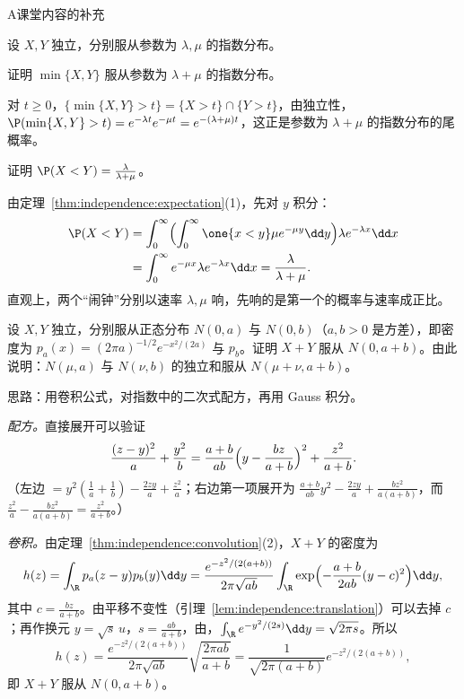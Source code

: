 \begin{exercises}{A}{课堂内容的补充}
\item\label{ex:independence:A5} 设 $X,Y$ 独立，分别服从参数为 $\lambda,\mu$ 的指数分布。
\begin{questions}
\item 证明 $\min\{X,Y\}$ 服从参数为 $\lambda+\mu$ 的指数分布。
\begin{solution}
对 $t\geqslant0$，$\{\min\{X,Y\}>t\}=\{X>t\}\cap\{Y>t\}$，由独立性，$\P(\min\{X,Y\}>t)=e^{-\lambda t}e^{-\mu t}=e^{-(\lambda+\mu)t}$，这正是参数为 $\lambda+\mu$ 的指数分布的尾概率。
\end{solution}
\item 证明 $\P(X<Y)=\frac\lambda{\lambda+\mu}$。
\begin{solution}
由定理~\ref{thm:independence:expectation}(1)，先对 $y$ 积分：
\[
\begin{aligned}
\P(X<Y)&=\int_0^\infty\Bigl(\int_0^\infty\one\{x<y\}\mu e^{-\mu y}\dd y\Bigr)\lambda e^{-\lambda x}\dd x\\
&=\int_0^\infty e^{-\mu x}\lambda e^{-\lambda x}\dd x=\frac\lambda{\lambda+\mu}.
\end{aligned}
\]
直观上，两个“闹钟”分别以速率 $\lambda,\mu$ 响，先响的是第一个的概率与速率成正比。
\end{solution}
\end{questions}

\item\label{ex:independence:A6} 设 $X,Y$ 独立，分别服从正态分布 $N(0,a)$ 与 $N(0,b)$（$a,b>0$ 是方差），即密度为 $p_a(x)=(2\pi a)^{-1/2}e^{-x^2/(2a)}$ 与 $p_b$。证明 $X+Y$ 服从 $N(0,a+b)$。由此说明：$N(\mu,a)$ 与 $N(\nu,b)$ 的独立和服从 $N(\mu+\nu,a+b)$。
\begin{solution}
思路：用卷积公式，对指数中的二次式配方，再用 Gauss 积分。

\emph{配方。}直接展开可以验证
\[
\frac{(z-y)^2}a+\frac{y^2}b=\frac{a+b}{ab}\Bigl(y-\frac{bz}{a+b}\Bigr)^2+\frac{z^2}{a+b}.
\]
（左边 $=y^2(\frac1a+\frac1b)-\frac{2zy}a+\frac{z^2}a$；右边第一项展开为 $\frac{a+b}{ab}y^2-\frac{2zy}a+\frac{bz^2}{a(a+b)}$，而 $\frac{z^2}a-\frac{bz^2}{a(a+b)}=\frac{z^2}{a+b}$。）

\emph{卷积。}由定理~\ref{thm:independence:convolution}(2)，$X+Y$ 的密度为
\[
h(z)=\int_\R p_a(z-y)p_b(y)\dd y=\frac{e^{-z^2/(2(a+b))}}{2\pi\sqrt{ab}}\int_\R\exp\Bigl(-\frac{a+b}{2ab}(y-c)^2\Bigr)\dd y,
\]
其中 $c=\frac{bz}{a+b}$。由平移不变性（引理~\ref{lem:independence:translation}）可以去掉 $c$；再作换元 $y=\sqrt{s}\,u$，$s=\frac{ab}{a+b}$，由，$\int_\R e^{-y^2/(2s)}\dd y=\sqrt{2\pi s}$。所以
\[
h(z)=\frac{e^{-z^2/(2(a+b))}}{2\pi\sqrt{ab}}\sqrt{\frac{2\pi ab}{a+b}}=\frac1{\sqrt{2\pi(a+b)}}e^{-z^2/(2(a+b))},
\]
即 $X+Y$ 服从 $N(0,a+b)$。


\end{solution}
\end{exercises}

